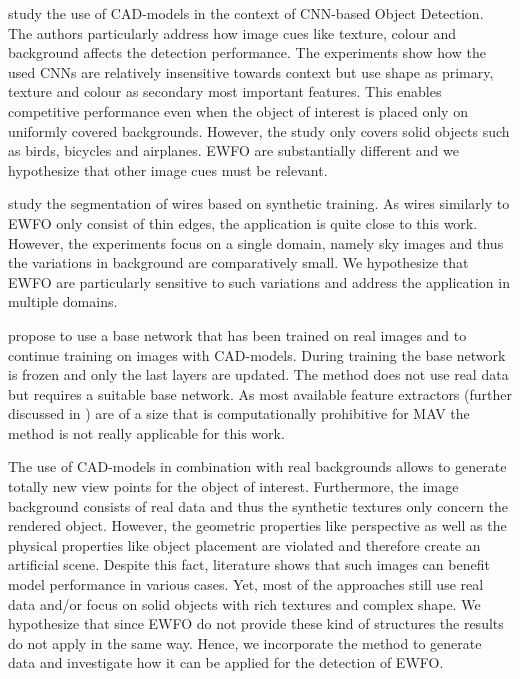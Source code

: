\citeauthor{Peng}\cite{Peng} study the use of \ac{CAD}-models in the context of \ac{CNN}-based Object Detection. The authors particularly address how image cues like texture, colour and background affects the detection performance. The experiments show how the used \acp{CNN} are relatively insensitive towards context but use shape as primary, texture and colour as secondary most important features. This enables competitive performance even when the object of interest is placed only on uniformly covered backgrounds. However, the study only covers solid objects such as birds, bicycles and airplanes. \ac{EWFO} are substantially different and we hypothesize that other image cues must be relevant.

\citeauthor{Madaan2017}\cite{Madaan2017} study the segmentation of wires based on synthetic training. As wires similarly to \ac{EWFO} only consist of thin edges, the application is quite close to this work. However, the experiments focus on a single domain, namely sky images and thus the variations in background are comparatively small. We hypothesize that \ac{EWFO} are particularly sensitive to such variations and address the application in multiple domains.

\citeauthor{Hinterstoisser2017} \cite{Hinterstoisser2017} propose to use a base network that has been trained on real images and to continue training on images with \ac{CAD}-models. During training the base network is frozen and only the last layers are updated. The method does not use real data but requires a suitable base network. As most available feature extractors (further discussed in ) are of a size that is computationally prohibitive for \ac{MAV} the method is not really applicable for this work. 

The use of CAD-models in combination with real backgrounds allows to generate totally new view points for the object of interest. Furthermore, the image background consists of real data and thus the synthetic textures only concern the rendered object. However, the geometric properties like perspective as well as the physical properties like object placement are violated and therefore create an artificial scene. Despite this fact, literature shows that such images can benefit model performance in various cases. Yet, most of the approaches still use real data and/or focus on solid objects with rich textures and complex shape. We hypothesize that since \ac{EWFO} do not provide these kind of structures the results do not apply in the same way. Hence, we incorporate the method to generate data and investigate how it can be applied for the detection of \ac{EWFO}.


